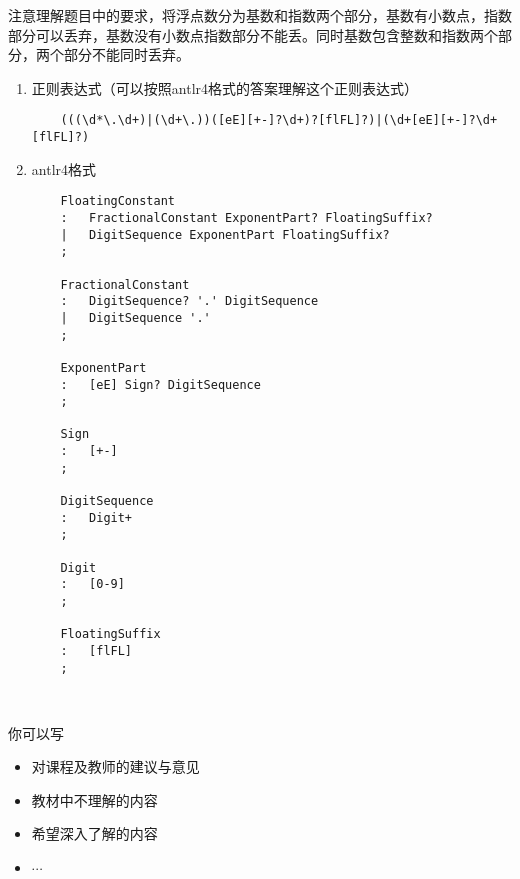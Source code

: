 \documentclass[a4paper, justified]{tufte-handout}
\begin{document}
\begin{solution}
注意理解题目中的要求，将浮点数分为基数和指数两个部分，基数有小数点，指数部分可以丢弃，基数没有小数点指数部分不能丢。同时基数包含整数和指数两个部分，两个部分不能同时丢弃。\\
\begin{enumerate}
    \item 正则表达式（可以按照antlr4格式的答案理解这个正则表达式）
    \begin{lstlisting}
    (((\d*\.\d+)|(\d+\.))([eE][+-]?\d+)?[flFL]?)|(\d+[eE][+-]?\d+[flFL]?)
    \end{lstlisting}

    \item antlr4格式
    \begin{lstlisting}
    FloatingConstant
    :   FractionalConstant ExponentPart? FloatingSuffix?
    |   DigitSequence ExponentPart FloatingSuffix?
    ;
    
    FractionalConstant
    :   DigitSequence? '.' DigitSequence
    |   DigitSequence '.'
    ;
    
    ExponentPart
    :   [eE] Sign? DigitSequence
    ;
    
    Sign
    :   [+-]
    ;
    
    DigitSequence
    :   Digit+
    ;
    
    Digit
    :   [0-9]
    ;
    
    FloatingSuffix
    :   [flFL]
    ;

    
    \end{lstlisting}
\end{enumerate}
\end{solution}



\beginfb

你可以写
\begin{itemize}
  \item 对课程及教师的建议与意见
  \item 教材中不理解的内容
  \item 希望深入了解的内容
  \item $\cdots$
\end{itemize}
\end{document}
